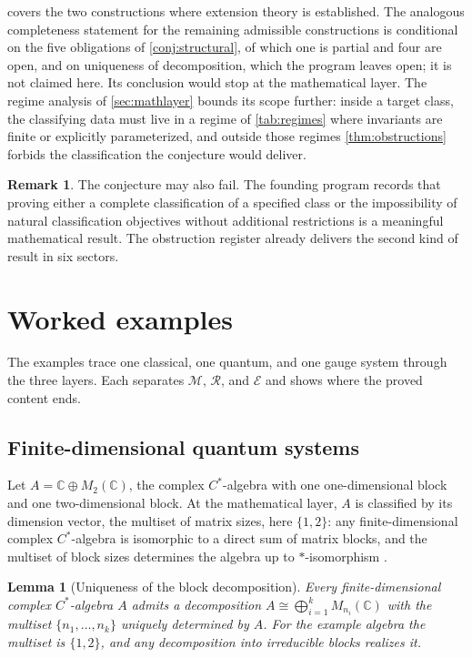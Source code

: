 \documentclass[11pt,letterpaper]{article}
\newtheorem{lemma}[theorem]{Lemma}
\theoremstyle{definition}
\newtheorem{remark}[theorem]{Remark}
\begin{document}
 covers the two constructions where extension theory is established. The analogous completeness statement for the remaining admissible constructions is conditional on the five obligations of \cref{conj:structural}, of which one is partial and four are open, and on uniqueness of decomposition, which the program leaves open; it is not claimed here. Its conclusion would stop at the mathematical layer. The regime analysis of \cref{sec:mathlayer} bounds its scope further: inside a target class, the classifying data must live in a regime of \cref{tab:regimes} where invariants are finite or explicitly parameterized, and outside those regimes \cref{thm:obstructions} forbids the classification the conjecture would deliver.

\begin{remark}
The conjecture may also fail. The founding program records that proving either a complete classification of a specified class or the impossibility of natural classification objectives without additional restrictions is a meaningful mathematical result. The obstruction register already delivers the second kind of result in six sectors.
\end{remark}

\section{Worked examples}
\label{sec:examples}

The examples trace one classical, one quantum, and one gauge system through the three layers. Each separates $\mathcal{M}$, $\mathcal{R}$, and $\mathcal{E}$ and shows where the proved content ends.

\subsection{Finite-dimensional quantum systems}

Let $A = \mathbb{C} \oplus M_2(\mathbb{C})$, the complex $C^*$-algebra with one one-dimensional block and one two-dimensional block. At the mathematical layer, $A$ is classified by its dimension vector, the multiset of matrix sizes, here $\{1, 2\}$: any finite-dimensional complex $C^*$-algebra is isomorphic to a direct sum of matrix blocks, and the multiset of block sizes determines the algebra up to $*$-isomorphism \cite{corpus-9,corpus-42}.

\begin{lemma}[Uniqueness of the block decomposition]
\label{lem:blocks}
Every finite-dimensional complex $C^*$-algebra $A$ admits a decomposition $A \cong \bigoplus_{i=1}^{k} M_{n_i}(\mathbb{C})$ with the multiset $\{n_1, \ldots, n_k\}$ uniquely determined by $A$. For the example algebra the multiset is $\{1, 2\}$, and any decomposition into irreducible blocks realizes it.
\end{lemma}
\end{document}
